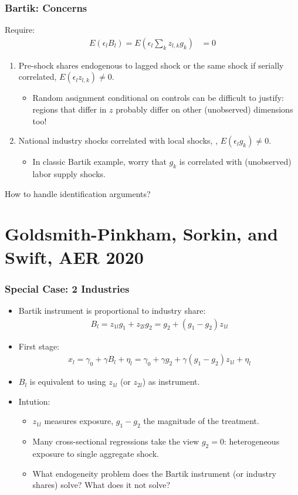 \documentclass[english,xcolor=svgnames]{beamer}
\begin{document}
\begin{frame}
\frametitle[alignment=center]{Bartik: Concerns}
Require:
\begin{align*}
		E(\epsilon_l B_l) = E(\epsilon_l \sum_k z_{l,k}g_k) &= 0  
	\end{align*}
\begin{enumerate}
	\item Pre-shock shares endogenous to lagged shock or the same shock if serially correlated, $E(\epsilon_l  z_{l,k})\neq 0$.
	\begin{itemize}
		\item Random assignment conditional on controls can be difficult to justify: regions that differ in $z$ probably differ on other (unobserved) dimensions too!
	\end{itemize}
	\item National industry shocks correlated with local shocks,
, $E(\epsilon_l  g_k)\neq 0$. 
	\begin{itemize}
		\item In classic Bartik example, worry that $g_k$ is correlated with (unobserved) labor supply shocks.
	\end{itemize}
\end{enumerate}
How to handle identification arguments?
\end{frame}


\section{Goldsmith-Pinkham, Sorkin, and Swift, AER 2020}

\begin{frame}
\frametitle[alignment=center]{Special Case: 2 Industries}
\begin{itemize}
	\item Bartik instrument is proportional to industry share:
	\begin{align*}
		B_l = z_{1l}g_1+z_{2l}g_2 = g_2 + (g_1-g_2)z_{1l}
	\end{align*}
	\item First stage:
	\begin{align*}
		x_l = \gamma_0 + \gamma B_l + \eta_l = \gamma_0 + \gamma g_2 + \gamma (g_1-g_2)z_{1l} + \eta_l 
	\end{align*}
	\item $B_l$ is equivalent to using $z_{1l}$ (or $z_{2l}$) as instrument.
	\item Intution:
	\begin{itemize}
		\item $z_{1l}$ measures exposure, $g_1-g_2$ the magnitude of the treatment.
		\item Many cross-sectional regressions take the view $g_2=0$: heterogeneous exposure to single aggregate shock.
		\item What endogeneity problem does the Bartik instrument (or industry shares) solve? What does it not solve?
	\end{itemize}
\end{itemize}
\end{frame}
\end{document}
